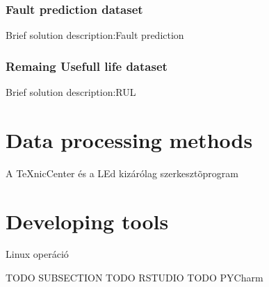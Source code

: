 			\subsubsection{Fault prediction dataset}
Brief solution description:Fault prediction
			\subsubsection{Remaing Usefull life dataset}
Brief solution description:RUL
	\section{Data processing methods}
A TeXnicCenter és a LEd kizárólag szerkesztõprogram 



	\section{Developing tools}
Linux operáció

TODO SUBSECTION
TODO RSTUDIO
TODO PYCharm